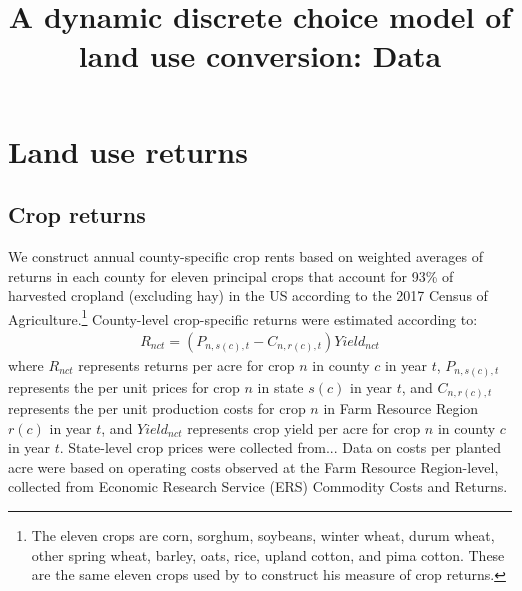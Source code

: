 \documentclass[11pt]{article}
\begin{document}
\title{{\bf A dynamic discrete choice model of land use conversion: Data}}


\maketitle

\section{Land use returns}

\subsection{Crop returns}

We construct annual county-specific crop rents based on weighted averages of returns in each county for eleven principal crops that account for 93\% of harvested cropland (excluding hay) in the US according to the 2017 Census of Agriculture.\footnote{The eleven crops are corn, sorghum, soybeans, winter wheat, durum wheat, other spring wheat, barley, oats, rice, upland cotton, and pima cotton. These are the same eleven crops used by \citet{scott2014} to construct his measure of crop returns.} County-level crop-specific returns were estimated according to:
\begin{align}
R_{nct} = (P_{n,s(c),t} - C_{n,r(c),t})Yield_{nct} 
\end{align}
where $R_{nct}$ represents returns per acre for crop $n$ in county $c$ in year $t$, $P_{n,s(c),t}$ represents the per unit prices for crop $n$ in state $s(c)$ in year $t$, and $C_{n,r(c),t}$ represents the per unit production costs for crop $n$ in Farm Resource Region $r(c)$ in year $t$, and $Yield_{nct}$ represents crop yield per acre for crop $n$ in county $c$ in year $t$. State-level crop prices were collected from... Data on costs per planted acre were based on operating costs observed at the Farm Resource Region-level, collected from Economic Research Service (ERS) Commodity Costs and Returns. 
\end{document}
